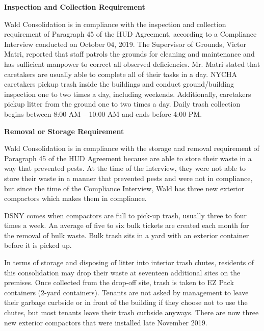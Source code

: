 

\textbf{Inspection and Collection Requirement} 

Wald Consolidation is in compliance with the inspection and collection requirement of Paragraph 45 of the HUD Agreement, according to a Compliance Interview conducted on October 04, 2019. The Supervisor of Grounds, Victor Matri, reported that staff patrols the grounds for cleaning and maintenance and has sufficient manpower to correct all observed deficiencies. Mr. Matri stated that caretakers are usually able to complete all of their tasks in a day.  NYCHA caretakers pickup trash inside the buildings and conduct ground/building inspection one to two times a day, including weekends. Additionally, caretakers pickup litter from the ground one to two times a day. Daily trash collection begins between 8:00 AM -- 10:00 AM and ends before 4:00 PM. 

 

\textbf{Removal or Storage Requirement} 

Wald Consolidation is in compliance with the storage and removal requirement of Paragraph 45 of the HUD Agreement because are able to store their waste in a way that prevented pests. At the time of the interview, they were not able to store their waste in a manner that prevented pests and were not in compliance, but since the time of the Compliance Interview, Wald has three new exterior compactors which makes them in compliance. 

DSNY comes when compactors are full to pick-up trash, usually three to four times a week. An average of five to six bulk tickets are created each month for the removal of bulk waste. Bulk trash sits in a yard with an exterior container before it is picked up.  

 

In terms of storage and disposing of litter into interior trash chutes, residents of this consolidation may drop their waste at seventeen additional sites on the premises. Once collected from the drop-off site, trash is taken to EZ Pack containers (2-yard containers). Tenants are not asked by management to leave their garbage curbside or in front of the building if they choose not to use the chutes, but most tenants leave their trash curbside anyways. There are now three new exterior compactors that were installed late November 2019. 

 

